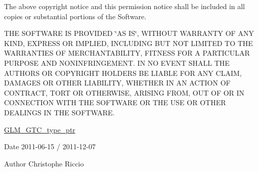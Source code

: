 The above copyright notice and this permission notice shall be included in all copies or substantial portions of the Software.

T\-H\-E S\-O\-F\-T\-W\-A\-R\-E I\-S P\-R\-O\-V\-I\-D\-E\-D \char`\"{}\-A\-S I\-S\char`\"{}, W\-I\-T\-H\-O\-U\-T W\-A\-R\-R\-A\-N\-T\-Y O\-F A\-N\-Y K\-I\-N\-D, E\-X\-P\-R\-E\-S\-S O\-R I\-M\-P\-L\-I\-E\-D, I\-N\-C\-L\-U\-D\-I\-N\-G B\-U\-T N\-O\-T L\-I\-M\-I\-T\-E\-D T\-O T\-H\-E W\-A\-R\-R\-A\-N\-T\-I\-E\-S O\-F M\-E\-R\-C\-H\-A\-N\-T\-A\-B\-I\-L\-I\-T\-Y, F\-I\-T\-N\-E\-S\-S F\-O\-R A P\-A\-R\-T\-I\-C\-U\-L\-A\-R P\-U\-R\-P\-O\-S\-E A\-N\-D N\-O\-N\-I\-N\-F\-R\-I\-N\-G\-E\-M\-E\-N\-T. I\-N N\-O E\-V\-E\-N\-T S\-H\-A\-L\-L T\-H\-E A\-U\-T\-H\-O\-R\-S O\-R C\-O\-P\-Y\-R\-I\-G\-H\-T H\-O\-L\-D\-E\-R\-S B\-E L\-I\-A\-B\-L\-E F\-O\-R A\-N\-Y C\-L\-A\-I\-M, D\-A\-M\-A\-G\-E\-S O\-R O\-T\-H\-E\-R L\-I\-A\-B\-I\-L\-I\-T\-Y, W\-H\-E\-T\-H\-E\-R I\-N A\-N A\-C\-T\-I\-O\-N O\-F C\-O\-N\-T\-R\-A\-C\-T, T\-O\-R\-T O\-R O\-T\-H\-E\-R\-W\-I\-S\-E, A\-R\-I\-S\-I\-N\-G F\-R\-O\-M, O\-U\-T O\-F O\-R I\-N C\-O\-N\-N\-E\-C\-T\-I\-O\-N W\-I\-T\-H T\-H\-E S\-O\-F\-T\-W\-A\-R\-E O\-R T\-H\-E U\-S\-E O\-R O\-T\-H\-E\-R D\-E\-A\-L\-I\-N\-G\-S I\-N T\-H\-E S\-O\-F\-T\-W\-A\-R\-E.

\hyperlink{group__gtc__type__ptr}{G\-L\-M\-\_\-\-G\-T\-C\-\_\-type\-\_\-ptr}

\begin{DoxyDate}{Date}
2011-\/06-\/15 / 2011-\/12-\/07 
\end{DoxyDate}
\begin{DoxyAuthor}{Author}
Christophe Riccio 
\end{DoxyAuthor}

